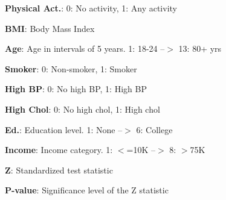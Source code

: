 \documentclass[11pt]{article}
\begin{document}
\begin{table}[h]
\caption{Association between  physical activity and diabetes prevalence}
\label{table:activity_and_diabetes_1}
\begin{threeparttable}
\renewcommand{\TPTminimum}{\linewidth}
\begin{tablenotes}
\footnotesize
\item \textbf{Physical Act.}: 0: No activity, 1: Any activity
\item \textbf{BMI}: Body Mass Index
\item \textbf{Age}: Age in intervals of 5 years. 1: 18-24 --$>$ 13: 80+ yrs
\item \textbf{Smoker}: 0: Non-smoker, 1: Smoker
\item \textbf{High BP}: 0: No high BP, 1: High BP
\item \textbf{High Chol}: 0: No high chol, 1: High chol
\item \textbf{Ed.}: Education level. 1: None --$>$ 6: College
\item \textbf{Income}: Income category. 1: $<$=10K --$>$ 8: $>$75K
\item \textbf{Z}: Standardized test statistic
\item \textbf{P-value}: Significance level of the Z statistic
\end{tablenotes}
\end{threeparttable}
\end{table}
\end{document}
